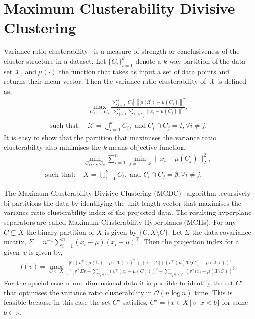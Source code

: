 \documentclass{book}
\def\R{\mathbb{R}}
\begin{document}
\section{Maximum Clusterability Divisive Clustering}

Variance ratio clusterability~\cite{Zhang2001} is a measure of strength or conclusiveness
of the cluster structure in a dataset. 
%
Let $\{C_i\}_{i=1}^k$ denote a $k$-way partition of the data set $\mathcal{X}$, and $\mu(\cdot)$ the function
that takes
as input a set of data points and returns their mean vector.
Then the variance ratio clusterability of~$\mathcal{X}$ is defined as,
%
\begin{align*}
%
& \max_{C_1,\ldots,C_k}\frac{\sum_{j=1}^k |C_j| \,  \left\| \mu(\mathcal{X}) - \mu(C_j) \right\|^2}
	{\sum_{j=1}^k   \sum_{x_i \in C_j}\|x_i - \mu(C_j)\|^2},\\
%
\text{such that: } & \mathcal{X} = \bigcup_{i=1}^k  C_i, \text{ and }  C_i \cap C_j = \emptyset, \forall i \neq j.
%
\end{align*}
%
It is easy to show that the partition that maximises the variance ratio clusterability
also minimises the $k$-means objective function,
%
\begin{align*}
%
& \min_{C_1, \ldots, C_k} \sum_{i=1}^n \min_{j = 1, \dots, k}\|x_i - \mu(C_j)\|_2^2,\\
%
\text{such that: } & X = \bigcup_{i=1}^k  C_i, \text{ and }  C_i \cap C_j = \emptyset, \forall i \neq j.
%
\end{align*}
%

The Maximum Clusterability Divisive Clustering (MCDC)~\cite{HofmeyrP2015}
algorithm recursively bi-partitions the data by identifying the 
unit-length vector that maximises
the variance ratio clusterability index of the projected data. 
%
The resulting hyperplane separators are called Maximum Clusterability Hyperplanes (MCHs). 
%
For any $C \subsetneq X$ the binary partition of $X$ is given by $\{C, X \setminus C\}$.
Let $\Sigma$ the data covariance matrix, $\Sigma = n^{-1} \sum_{i=1}^n (x_i - \mu)(x_i-\mu)^\top$.
%
Then the projection index for a given~$v$ is given by,
%
\begin{align*}
%
f(v) = \max_{C \subset X} \frac{\vert C | \left(v^\top( \mu({C}) - \mu(\mathcal{X}))\right)^2 + (n-|C|)\left(v^\top( \mu(\mathcal{X}\setminus C) - \mu(\mathcal{X}))\right)^2}
%
{\frac{n}{n-1}v^\top \Sigma v +   \sum_{x_i \in C}\left(v^\top(x_i - \mu(C))\right)^2 +  \sum_{x_i \in \mathcal{X}\setminus C}\left(v^\top(x_i - \mu(\mathcal{X} \setminus C)\right)^2}.
%
\end{align*}
%
For the special case of one dimensional data it is possible to identify the set $C^\star$
that optimises the variance ratio clusterability in 
$\mathcal{O}(n \log n)$ time. This is feasible because in this case the set $C^\star$ 
satisfies, $C^\star = \{ x \in X \,|\, v^\top x < b \}$ for some
$b \in \R$.
\end{document}

